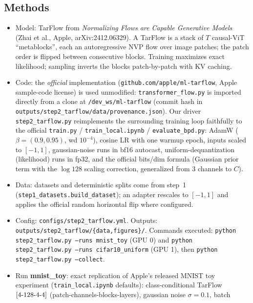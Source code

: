 \documentclass[11pt]{article}
\begin{document}
\subsection{Methods}
\begin{itemize}
  \item Model: TarFlow from \emph{Normalizing Flows are Capable Generative
        Models} (Zhai et al., Apple, arXiv:2412.06329). A TarFlow is a stack
        of $T$ causal-ViT ``metablocks'', each an autoregressive NVP flow over
        image patches; the patch order is flipped between consecutive blocks.
        Training maximizes exact likelihood; sampling inverts the blocks
        patch-by-patch with KV caching.
  \item Code: the \emph{official} implementation
        (\texttt{github.com/apple/ml-tarflow}, Apple sample-code license) is
        used unmodified: \texttt{transformer\_flow.py} is imported directly
        from a clone at \texttt{/dev\_ws/ml-tarflow} (commit hash in
        \texttt{outputs/step2\_tarflow/data/provenance.json}). Our driver
        \texttt{step2\_tarflow.py} reimplements the surrounding training loop
        faithfully to the official \texttt{train.py} /
        \texttt{train\_local.ipynb} / \texttt{evaluate\_bpd.py}: AdamW
        ($\beta=(0.9,0.95)$, wd $10^{-4}$), cosine LR with one warmup epoch,
        inputs scaled to $[-1,1]$, gaussian-noise runs in bf16 autocast,
        uniform-dequantization (likelihood) runs in fp32, and the official
        bits/dim formula (Gaussian prior term with the $\log 128$ scaling
        correction, generalized from 3 channels to $C$).
  \item Data: datasets and deterministic splits come from step~1
        (\texttt{step1\_datasets.build\_dataset}); an adapter rescales to
        $[-1,1]$ and applies the official random horizontal flip where
        configured.
  \item Config: \texttt{configs/step2\_tarflow.yml}. Outputs:
        \texttt{outputs/step2\_tarflow/\{data,figures\}/}. Commands executed:
        \texttt{python step2\_tarflow.py --runs mnist\_toy} (GPU 0) and
        \texttt{python step2\_tarflow.py --runs cifar10\_uniform} (GPU 1),
        then \texttt{python step2\_tarflow.py --collect}.
  \item Run \textbf{mnist\_toy}: exact replication of Apple's released MNIST
        toy experiment (\texttt{train\_local.ipynb} defaults):
        class-conditional TarFlow $[4\hbox{-}128\hbox{-}4\hbox{-}4]$
        (patch-channels-blocks-layers), gaussian noise $\sigma=0.1$, batch

\end{itemize}
\end{document}
